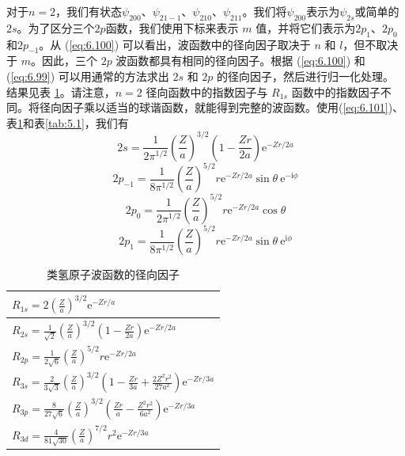     对于$n=2$，我们有状态$\psi_{200}$、$\psi_{21-1}$、$\psi_{210}$、$\psi_{211}$。我们将$\psi_{200}$表示为$\psi_{2s}$或简单的$2s$。为了区分三个$2p$函数，我们使用下标来表示 $m$ 值，并将它们表示为$2p_1$、$2p_0$和$2p_{-1}$。从 (\ref{eq:6.100}) 可以看出，波函数中的径向因子取决于 $n$ 和 $l$，但不取决于 $m$。因此，三个 $2p$ 波函数都具有相同的径向因子。根据 (\ref{eq:6.100}) 和 (\ref{eq:6.99}) 可以用通常的方法求出 $2s$ 和 $2p$ 的径向因子，然后进行归一化处理。结果见表 \ref{tab:6.1}。请注意，$n=2$ 径向函数中的指数因子与 $R_{1s}$ 函数中的指数因子不同。将径向因子乘以适当的球谐函数，就能得到完整的波函数。使用(\ref{eq:6.101})、表\ref{tab:6.1}和表\ref{tab:5.1}，我们有
    \begin{equation}
        2s = \frac{1}{2\pi^{1/2}}\left(\frac{Z}{a}\right)^{3/2}\left(1 - \frac{Zr}{2a}\right)\mathrm{e}^{-Zr/2a}
        \label{eq:6.111}
    \end{equation}
    \begin{equation}
        2p_{-1} = \frac{1}{8\pi^{1/2}}\left(\frac{Z}{a}\right)^{5/2}r\mathrm{e}^{-Zr/2a}\sin\theta\:\mathrm{e}^{-\mathrm{i}\phi}
        \label{eq:6.112}
    \end{equation}
    \begin{equation}
        2p_0 = \frac{1}{2\pi^{1/2}}\left(\frac{Z}{a}\right)^{5/2}r\mathrm{e}^{-Zr/2a}\cos\theta
        \label{eq:6.113}
    \end{equation}
    \begin{equation}
        2p_1 = \frac{1}{8\pi^{1/2}}\left(\frac{Z}{a}\right)^{5/2}r\mathrm{e}^{-Zr/2a}\sin\theta\:\mathrm{e}^{\mathrm{i}\phi}
        \label{eq:6.114}
    \end{equation}
    \begin{table}[htbp]
        \centering
        \caption{类氢原子波函数的径向因子}
        \label{tab:6.1}
        \renewcommand{\arraystretch}{1.5}
        \begin{tabular}{l}
            \hline
            $R_{1s} = 2\left(\frac{Z}{a}\right)^{3/2}\mathrm{e}^{-Zr/a}$ \\[0.5ex]
            \hline
            $R_{2s} = \frac{1}{\sqrt{2}}\left(\frac{Z}{a}\right)^{3/2}\left(1 - \frac{Zr}{2a}\right)\mathrm{e}^{-Zr/2a}$ \\[0.5ex]
            \hline
            $R_{2p} = \frac{1}{2\sqrt{6}}\left(\frac{Z}{a}\right)^{5/2}r\mathrm{e}^{-Zr/2a}$ \\[0.5ex]
            \hline
            $R_{3s} = \frac{2}{3\sqrt{3}}\left(\frac{Z}{a}\right)^{3/2}\left(1 - \frac{Zr}{3a} + \frac{2Z^2r^2}{27a^2}\right)\mathrm{e}^{-Zr/3a}$ \\[0.5ex]
            \hline
            $R_{3p} = \frac{8}{27\sqrt{6}}\left(\frac{Z}{a}\right)^{3/2}\left(\frac{Zr}{a} - \frac{Z^2r^2}{6a^2}\right)\mathrm{e}^{-Zr/3a}$ \\[0.5ex]
            \hline
            $R_{3d} = \frac{4}{81\sqrt{30}}\left(\frac{Z}{a}\right)^{7/2}r^2\mathrm{e}^{-Zr/3a}$ \\[0.5ex]
            \hline
        \end{tabular}
    \end{table}

